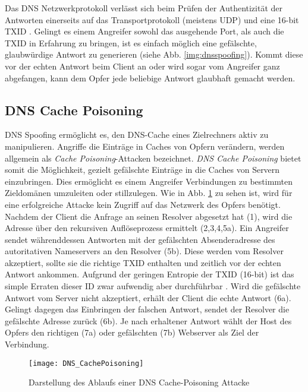 Das DNS Netzwerkprotokoll verlässt sich beim Prüfen der Authentizität der Antworten einerseits auf das Transportprotokoll (meistens UDP) und eine 16-bit \ac{TXID} \cite{rfc1035}. Gelingt es einem Angreifer sowohl das ausgehende Port, als auch die \ac{TXID} in Erfahrung zu bringen, ist es einfach möglich eine gefälschte, glaubwürdige Antwort zu generieren (siehe Abb. \ref{img:dnsspoofing}). Kommt diese vor der echten Antwort beim Client an oder wird sogar vom Angreifer ganz abgefangen, kann dem Opfer jede beliebige Antwort glaubhaft gemacht werden.

\subsection{DNS Cache Poisoning}
DNS Spoofing ermöglicht es, den DNS-Cache eines Zielrechners aktiv zu manipulieren. Angriffe die Einträge in Caches von Opfern verändern, werden allgemein als \textit{Cache Poisoning}-Attacken bezeichnet\cite{CAPEC141}. \textit{DNS Cache Poisoning} bietet somit die Möglichkeit, gezielt gefälschte Einträge in die Caches von Servern einzubringen\cite{CAPEC142}. Dies ermöglicht es einem Angreifer Verbindungen zu bestimmten Zieldomänen umzuleiten oder stillzulegen. Wie in Abb. \ref{img:dnscachepoisoning} zu sehen ist, wird für eine erfolgreiche Attacke kein Zugriff auf das Netzwerk des Opfers benötigt. Nachdem der Client die Anfrage an seinen Resolver abgesetzt hat (1), wird die Adresse über den rekursiven Auflöseprozess ermittelt (2,3,4,5a). Ein Angreifer sendet währenddessen Antworten mit der gefälschten Absenderadresse des autoritativen Nameservers an den Resolver (5b). Diese werden vom Resolver akzeptiert, sollte sie die richtige \ac{TXID} enthalten und zeitlich vor der echten Antwort ankommen. Aufgrund der geringen Entropie der \ac{TXID} (16-bit) ist das simple Erraten dieser ID zwar aufwendig aber durchführbar \cite{Son2010}. Wird die gefälschte Antwort vom Server nicht akzeptiert, erhält der Client die echte Antwort (6a). Gelingt dagegen das Einbringen der falschen Antwort, sendet der Resolver die gefälschte Adresse zurück (6b). Je nach erhaltener Antwort wählt der Host des Opfers den richtigen (7a) oder gefälschten (7b) Webserver als Ziel der Verbindung.    

\begin{figure}[htbp]
    \centering
    \texttt{[image: DNS\_CachePoisoning]}
    \caption{Darstellung des Ablaufs einer DNS Cache-Poisoning Attacke}
    \label{img:dnscachepoisoning}
\end{figure}

